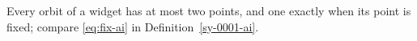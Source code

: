 \begin{lemma}[Orbits]\label{sy-0002-ai}
Every orbit of a widget has at most two points, and one exactly when its point is fixed; compare \eqref{eq:fix-ai} in Definition~\ref{sy-0001-ai}.
\end{lemma}